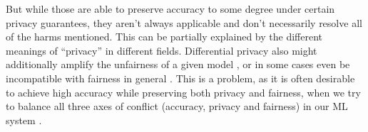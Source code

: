 	But while those are able to preserve accuracy to some degree under certain privacy guarantees, they aren't always applicable and don't necessarily resolve all of the harms mentioned.
	This can be partially explained by the different meanings of \enquote{privacy} in different fields.
	Differential privacy also might additionally amplify the unfairness of a given model \cite{bagdasaryan2019differential}, or in some cases even be incompatible with fairness in general \cite{cummings2019compatibility}. 
	This is a problem, as it is often desirable to achieve high accuracy while preserving both privacy and fairness, \eg when we try to balance all three axes of conflict (accuracy, privacy and fairness) in our ML system \cite{Chester2020}.
